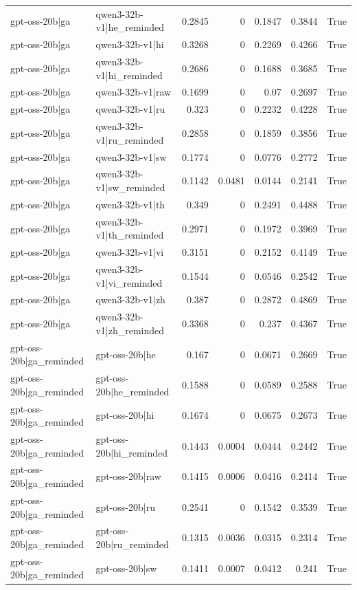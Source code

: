 \begin{table}
\begin{tabular}{l l r r r r l}
gpt-oss-20b|ga & qwen3-32b-v1|he_reminded & 0.2845 & 0 & 0.1847 & 0.3844 & True \\
gpt-oss-20b|ga & qwen3-32b-v1|hi & 0.3268 & 0 & 0.2269 & 0.4266 & True \\
gpt-oss-20b|ga & qwen3-32b-v1|hi_reminded & 0.2686 & 0 & 0.1688 & 0.3685 & True \\
gpt-oss-20b|ga & qwen3-32b-v1|raw & 0.1699 & 0 & 0.07 & 0.2697 & True \\
gpt-oss-20b|ga & qwen3-32b-v1|ru & 0.323 & 0 & 0.2232 & 0.4228 & True \\
gpt-oss-20b|ga & qwen3-32b-v1|ru_reminded & 0.2858 & 0 & 0.1859 & 0.3856 & True \\
gpt-oss-20b|ga & qwen3-32b-v1|sw & 0.1774 & 0 & 0.0776 & 0.2772 & True \\
gpt-oss-20b|ga & qwen3-32b-v1|sw_reminded & 0.1142 & 0.0481 & 0.0144 & 0.2141 & True \\
gpt-oss-20b|ga & qwen3-32b-v1|th & 0.349 & 0 & 0.2491 & 0.4488 & True \\
gpt-oss-20b|ga & qwen3-32b-v1|th_reminded & 0.2971 & 0 & 0.1972 & 0.3969 & True \\
gpt-oss-20b|ga & qwen3-32b-v1|vi & 0.3151 & 0 & 0.2152 & 0.4149 & True \\
gpt-oss-20b|ga & qwen3-32b-v1|vi_reminded & 0.1544 & 0 & 0.0546 & 0.2542 & True \\
gpt-oss-20b|ga & qwen3-32b-v1|zh & 0.387 & 0 & 0.2872 & 0.4869 & True \\
gpt-oss-20b|ga & qwen3-32b-v1|zh_reminded & 0.3368 & 0 & 0.237 & 0.4367 & True \\
gpt-oss-20b|ga_reminded & gpt-oss-20b|he & 0.167 & 0 & 0.0671 & 0.2669 & True \\
gpt-oss-20b|ga_reminded & gpt-oss-20b|he_reminded & 0.1588 & 0 & 0.0589 & 0.2588 & True \\
gpt-oss-20b|ga_reminded & gpt-oss-20b|hi & 0.1674 & 0 & 0.0675 & 0.2673 & True \\
gpt-oss-20b|ga_reminded & gpt-oss-20b|hi_reminded & 0.1443 & 0.0004 & 0.0444 & 0.2442 & True \\
gpt-oss-20b|ga_reminded & gpt-oss-20b|raw & 0.1415 & 0.0006 & 0.0416 & 0.2414 & True \\
gpt-oss-20b|ga_reminded & gpt-oss-20b|ru & 0.2541 & 0 & 0.1542 & 0.3539 & True \\
gpt-oss-20b|ga_reminded & gpt-oss-20b|ru_reminded & 0.1315 & 0.0036 & 0.0315 & 0.2314 & True \\
gpt-oss-20b|ga_reminded & gpt-oss-20b|sw & 0.1411 & 0.0007 & 0.0412 & 0.241 & True \\

\end{tabular}
\end{table}
